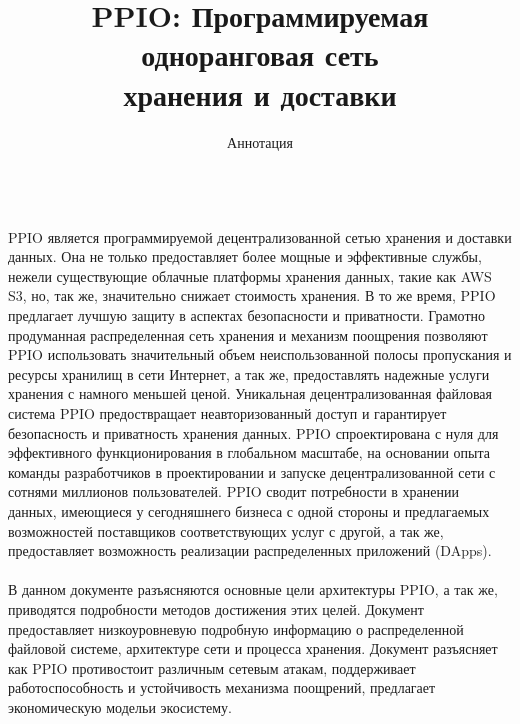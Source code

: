 \documentclass[10pt,a4paper]{article}
\title{ \LARGE\bf PPIO: Программируемая одноранговая сеть\\хранения и доставки}  %
\begin{document}
\maketitle%
\renewcommand{\baselinestretch}{1.2}
\author {\centerline{\Large Аннотация}}
\noindent\\
PPIO является программируемой децентрализованной сетью хранения и доставки данных. Она не только предоставляет более мощные и эффективные службы, нежели существующие облачные платформы хранения данных, такие как AWS S3, но, так же, значительно снижает стоимость хранения.  В то же время, PPIO предлагает лучшую защиту в аспектах безопасности и приватности. Грамотно продуманная распределенная сеть хранения и механизм поощрения позволяют PPIO использовать значительный объем неиспользованной полосы пропускания и ресурсы хранилищ в сети Интернет, а так же, предоставлять надежные услуги хранения с намного меньшей ценой. Уникальная децентрализованная файловая система PPIO предоствращает неавторизованный доступ и гарантирует безопасность и приватность хранения данных. PPIO спроектирована с нуля для эффективного функционирования в глобальном масштабе, на основании опыта команды разработчиков в проектировании и запуске децентрализованной сети с сотнями миллионов пользователей. PPIO сводит потребности в хранении данных, имеющиеся у сегодняшнего бизнеса с одной стороны и предлагаемых возможностей поставщиков соответствующих услуг с другой, а так же, предоставляет возможность реализации распределенных приложений (DApps).
\vspace{-0.5em}
\\ \\ В данном документе разъясняются основные цели архитектуры PPIO, а так же, приводятся подробности методов достижения этих целей. Документ предоставляет низкоуровневую подробную информацию о распределенной файловой системе, архитектуре сети и процесса хранения. Документ разъясняет как PPIO противостоит различным сетевым атакам, поддерживает работоспособность и устойчивость механизма поощрений, предлагает экономическую модельи экосистему.
\newpage
\tableofcontents %
\newpage
\end{document}
